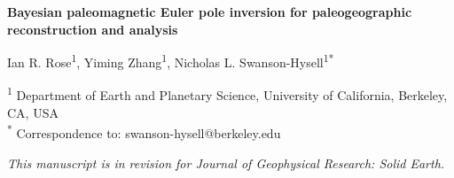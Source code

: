 \documentclass[11pt,letterpaper]{article}
\begin{document}
\begin{flushleft}
{\Large \textbf{Bayesian paleomagnetic Euler pole inversion for paleogeographic reconstruction and analysis}}

Ian R. Rose\textsuperscript{1},
Yiming Zhang\textsuperscript{1},
Nicholas L. Swanson-Hysell\textsuperscript{1}\textsuperscript{*}

\bigskip
\textsuperscript{1} Department of Earth and Planetary Science, University of California, Berkeley, CA, USA\\
\textsuperscript{*} Correspondence to: swanson-hysell@berkeley.edu
\end{flushleft}

\noindent\textit{This manuscript is in revision for Journal of Geophysical Research: Solid Earth.}

\linenumbers

\end{document}
